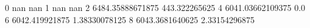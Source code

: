 0 nan nan
1 nan nan
2 6484.35888671875 443.322265625
4 6041.03662109375 0.0
6 6042.419921875 1.38330078125
8 6043.3681640625 2.33154296875
